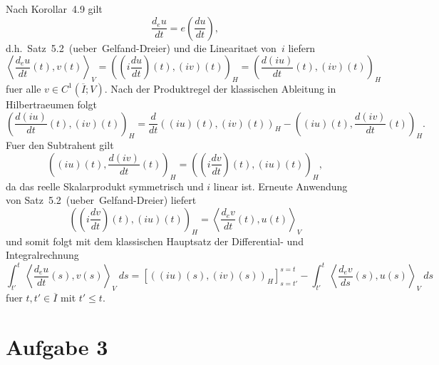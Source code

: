 \documentclass{article}
\begin{document}
Nach Korollar~4.9 gilt
\begin{equation*}
  \frac{d_e u}{dt} = e \left(\frac{du}{dt}\right),
\end{equation*}
d.h.\ Satz~5.2~(ueber~Gelfand-Dreier) und die Linearitaet von~$i$ liefern
\begin{equation*}
  \left\langle \frac{d_e u}{dt}(t), v(t) \right\rangle_V
  = \left(\left(i \frac{du}{dt} \right)(t), (iv)(t)\right)_H
  = \left(\frac{d \left(iu \right)}{dt}(t), (iv)(t)\right)_H
\end{equation*}
fuer alle $v \in C^1(\overline{I}; V)$. Nach der Produktregel der klassischen Ableitung in Hilbertraeumen folgt
\begin{equation*}
  \left(\frac{d \left(iu \right)}{dt} (t), (iv)(t)\right)_H
  = \frac{d}{dt} \left(\left(iu \right)(t), (iv)(t)\right)_H
  - \left(\left(iu \right)(t), \frac{d (iv)}{dt} (t)\right)_H.
\end{equation*}
Fuer den Subtrahent gilt
\begin{equation*}
  \left(\left(iu \right)(t), \frac{d (iv)}{dt} (t)\right)_H
  = \left(\left(i \frac{dv}{dt} \right)(t), (iu)(t)\right)_H,
\end{equation*}
da das reelle Skalarprodukt symmetrisch und $i$ linear ist. Erneute Anwendung von Satz~5.2~(ueber~Gelfand-Dreier) liefert
\begin{equation*}
  \left(\left(i \frac{dv}{dt} \right)(t), (iu)(t)\right)_H
  = \left\langle \frac{d_e v}{dt} (t), u(t)\right\rangle_V
\end{equation*}
und somit folgt mit dem klassischen Hauptsatz der Differential- und Integralrechnung
\begin{equation*}
  \int_{t'}^{t} \left\langle \frac{d_e u}{dt}(s), v(s) \right\rangle_V \ ds
  = \left[\left(\left(iu \right)(s), (iv)(s)\right)_H \right]_{s=t'}^{s=t}
  - \int_{t'}^{t} \left\langle \frac{d_e v}{ds} (s), u(s)\right\rangle_V \ ds
\end{equation*}
fuer $t,t' \in \overline{I}$ mit $t' \leq t$.

\section*{Aufgabe 3}
\end{document}
